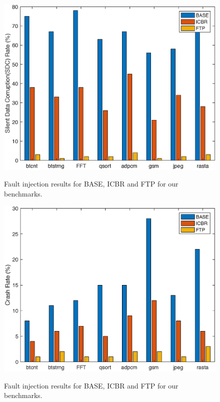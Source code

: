 \begin{figure}[!t]
\begin{center}
{\label{fig:plan_11}\includegraphics[scale=0.4]{./figures/Figure_9_final.eps}}
\end{center}
\caption{Fault injection results for BASE, ICBR and FTP for our benchmarks.}
\label{fig:plan_11}
\end{figure}

\begin{figure}[!t]
\begin{center}
{\label{fig:plan_12}\includegraphics[scale=0.42]{./figures/Figure_10_ff.eps}}
\end{center}
\caption{Fault injection results for BASE, ICBR and FTP for our benchmarks.}
\label{fig:plan_12}
\end{figure}

